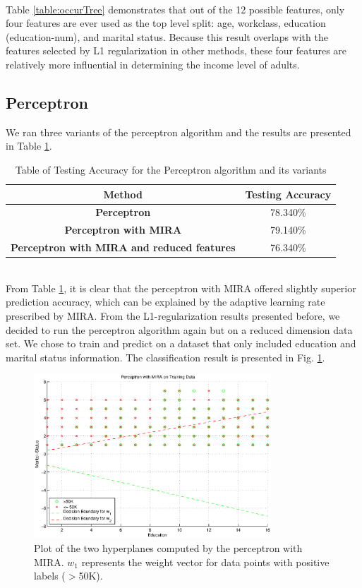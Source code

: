 \documentclass[conference]{IEEEtran}
\begin{document}
\\
Table \ref{table:occurTree} demonstrates that out of the 12 possible features, only four features are ever used as the top level split: age, workclass, education (education-num), and marital status. Because this result overlaps with the features selected by L1 regularization in other methods, these four features are relatively more influential in determining the income level of adults. \\
\subsection{Perceptron}
We ran three variants of the perceptron algorithm and the results are presented in Table \ref{table:perceptronResults}.
\begin{table}[h]
\centering
\begin{tabular}{|c|c|}
\hline
\textbf{Method} & \textbf{Testing Accuracy} \\ \hline
\textbf{Perceptron} & 78.340\% \\ \hline
\textbf{Perceptron with MIRA} & 79.140\% \\ \hline
\textbf{Perceptron with MIRA and reduced features} & 76.340\% \\ \hline
\end{tabular}
\caption{Table of Testing Accuracy for the Perceptron algorithm and its variants}
\label{table:perceptronResults}
\end{table} \\
From Table \ref{table:perceptronResults}, it is clear that the perceptron with MIRA offered slightly superior prediction accuracy, which can be explained by the adaptive learning rate prescribed by MIRA. From the L1-regularization results presented before, we decided to run the perceptron algorithm again but on a reduced dimension data set. We chose to train and predict on a dataset that only included education and marital status information. The classification result is presented in Fig. \ref{fig:miraPerceptron}. 
\begin{figure}[h!]
\centering
\includegraphics[width=3.5in]{miraPerceptron.eps}
\caption{Plot of the two hyperplanes computed by the perceptron with MIRA. $w_1$ represents the weight vector for data points with positive labels ($>$50K).}
\label{fig:miraPerceptron}
\end{figure}
\end{document}
